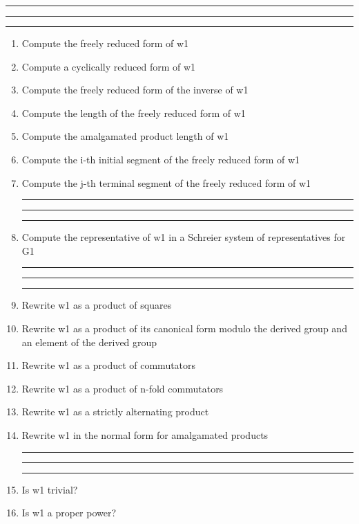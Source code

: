 
\bigskip
\hrule\hrule\hrule

\begin{enumerate}

\item Compute the freely reduced form of w1

\item Compute a cyclically reduced form of w1

\item Compute the freely reduced form of the inverse of w1

\item Compute the length of the freely reduced form of w1

\item Compute the amalgamated product length of w1

\item Compute the i-th initial segment of the freely reduced form of w1

\item Compute the j-th terminal segment of the freely reduced form of w1

\bigskip
\hrule\hrule\hrule

\item Compute the representative of w1 in a Schreier system of representatives for
G1


\bigskip
\hrule\hrule\hrule

\item Rewrite w1 as a product of squares

\item Rewrite w1 as a product of its canonical form modulo the derived group
and an element of the derived group

\item Rewrite w1 as a product of commutators

\item Rewrite w1 as a product of n-fold commutators

\item Rewrite w1 as a strictly alternating product

\item Rewrite w1 in the normal form for amalgamated products
\bigskip
\hrule\hrule\hrule

\item Is w1 trivial?

\item Is w1 a proper power?


\end{enumerate}
